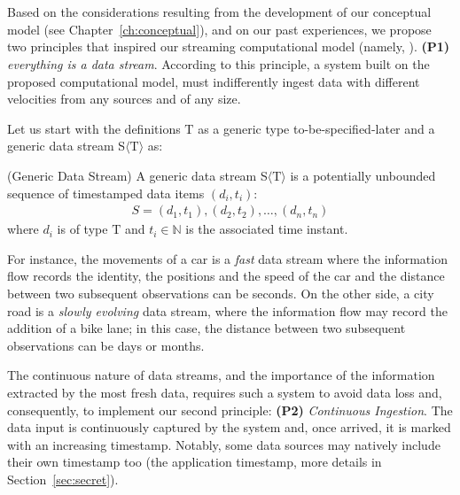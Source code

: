 {\color{red}

\section{\texorpdfstring{\protect\river{}}{RIVER}}\label{sec:comp-mod-sol}

Based on the considerations resulting from the development of our conceptual model (see Chapter~\ref{ch:conceptual}), and on our past experiences, we propose two principles that inspired our streaming computational model (namely, \river{}).
\textbf{(P1)} \textit{everything is a data stream}. According to this principle, a system built on the proposed computational model, must indifferently ingest data with different velocities from any sources and of any size. 

Let us start with the definitions $\mathrm{T}$ as a generic type to-be-specified-later and a generic data stream S$\langle\mathrm{T}\rangle$ as:

\begin{Definition}
(Generic Data Stream) A generic data stream S$\langle\mathrm{T}\rangle$ is a potentially unbounded sequence of timestamped data items $(d_i,t_i)$:
\noindent\begin{align*}
S = (d_1,t_1), (d_2,t_2), \ldots, (d_n,t_n)
\end{align*}  
where $d_i$ is of type $\mathrm{T}$ and $t_i \in \mathbb{N}$ is the associated time instant. 
\end{Definition}

For instance,  the movements of a car is a \textit{fast} data stream where the information flow records the identity, the positions and the speed of the car and the distance between two subsequent observations can be seconds.  On the other side, a city road is a \textit{slowly evolving} data stream, where the information flow may record the addition of a bike lane; in this case, the distance between two subsequent observations can be days or months. 

The continuous nature of data streams, and the importance of the information extracted by the most fresh data, requires such a system to avoid data loss and, consequently, to implement our second principle: \textbf{(P2)} \textit{Continuous Ingestion}. The data input is continuously captured by the system and, once arrived, it is marked with an increasing timestamp. Notably, some data sources may natively include their own timestamp too (the application timestamp, more details in Section~\ref{sec:secret}). 

}
